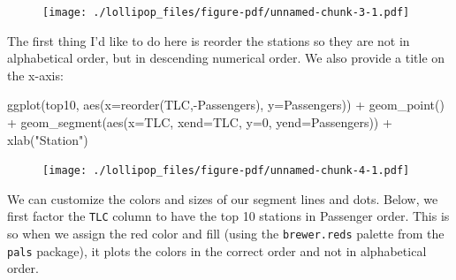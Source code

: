 \documentclass[
  letterpaper,
  DIV=11,
  numbers=noendperiod]{scrreprt}
\newenvironment{Shaded}{\begin{snugshade}}{\end{snugshade}}
\newcommand{\AttributeTok}[1]{\textcolor[rgb]{0.40,0.45,0.13}{#1}}
\newcommand{\DecValTok}[1]{\textcolor[rgb]{0.68,0.00,0.00}{#1}}
\newcommand{\FunctionTok}[1]{\textcolor[rgb]{0.28,0.35,0.67}{#1}}
\newcommand{\NormalTok}[1]{\textcolor[rgb]{0.00,0.23,0.31}{#1}}
\newcommand{\SpecialCharTok}[1]{\textcolor[rgb]{0.37,0.37,0.37}{#1}}
\newcommand{\StringTok}[1]{\textcolor[rgb]{0.13,0.47,0.30}{#1}}
\begin{document}
\begin{figure}[H]

{\centering \texttt{[image: ./lollipop\_files/figure-pdf/unnamed-chunk-3-1.pdf]}

}

\end{figure}

The first thing I'd like to do here is reorder the stations so they are
not in alphabetical order, but in descending numerical order. We also
provide a title on the x-axis:

\begin{Shaded}
\begin{Highlighting}[]
\FunctionTok{ggplot}\NormalTok{(top10, }\FunctionTok{aes}\NormalTok{(}\AttributeTok{x=}\FunctionTok{reorder}\NormalTok{(TLC,}\SpecialCharTok{{-}}\NormalTok{Passengers), }\AttributeTok{y=}\NormalTok{Passengers)) }\SpecialCharTok{+}
  \FunctionTok{geom\_point}\NormalTok{() }\SpecialCharTok{+} 
  \FunctionTok{geom\_segment}\NormalTok{(}\FunctionTok{aes}\NormalTok{(}\AttributeTok{x=}\NormalTok{TLC, }\AttributeTok{xend=}\NormalTok{TLC, }\AttributeTok{y=}\DecValTok{0}\NormalTok{, }\AttributeTok{yend=}\NormalTok{Passengers)) }\SpecialCharTok{+}
  \FunctionTok{xlab}\NormalTok{(}\StringTok{"Station"}\NormalTok{)}
\end{Highlighting}
\end{Shaded}

\begin{figure}[H]

{\centering \texttt{[image: ./lollipop\_files/figure-pdf/unnamed-chunk-4-1.pdf]}

}

\end{figure}

We can customize the colors and sizes of our segment lines and dots.
Below, we first factor the \texttt{TLC} column to have the top 10
stations in Passenger order. This is so when we assign the red color and
fill (using the \texttt{brewer.reds} palette from the \texttt{pals}
package), it plots the colors in the correct order and not in
alphabetical order.
\end{document}
